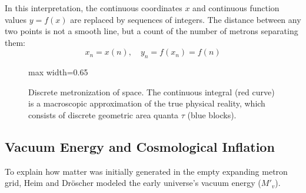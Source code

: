 \documentclass[11pt,a4paper,oneside]{article}
\begin{document}
In this interpretation, the continuous coordinates $x$ and continuous function values $y = f(x)$ are replaced by sequences of integers. The distance between any two points is not a smooth line, but a count of the number of metrons separating them:
\begin{equation}
    x_n = x(n), \quad y_n = f(x_n) = f(n)
\end{equation}

\begin{figure}[htbp]
\centering
\begin{adjustbox}{max width=0.65\textwidth}
\end{adjustbox}
\caption{Discrete metronization of space. The continuous integral (red curve) is a macroscopic approximation of the true physical reality, which consists of discrete geometric area quanta $\tau$ (blue blocks).}
\end{figure}

\subsection{Vacuum Energy and Cosmological Inflation}
To explain how matter was initially generated in the empty expanding metron grid, Heim and Dröscher modeled the early universe's vacuum energy ($M'_v$). 
\end{document}
